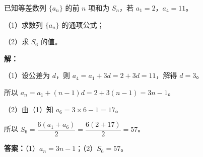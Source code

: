 \documentclass[
]{ctexart}
\begin{document}
已知等差数列 \(\{a_n\}\) 的前 \(n\) 项和为 \(S_n\)，若
\(a_1=2\)，\(a_4=11\)。

（1）求数列 \(\{a_n\}\) 的通项公式；

（2）求 \(S_6\) 的值。

\textbf{解：}

（1）设公差为 \(d\)，则 \(a_4=a_1+3d=2+3d=11\)，解得 \(d=3\)。

所以 \(a_n=a_1+(n-1)d=2+3(n-1)=3n-1\)。

（2）由（1）知 \(a_6=3\times 6-1=17\)。

所以 \(S_6=\dfrac{6(a_1+a_6)}{2}=\dfrac{6(2+17)}{2}=57\)。

\textbf{答案：}（1）\(a_n=3n-1\)；（2）\(S_6=57\)。
\end{document}
